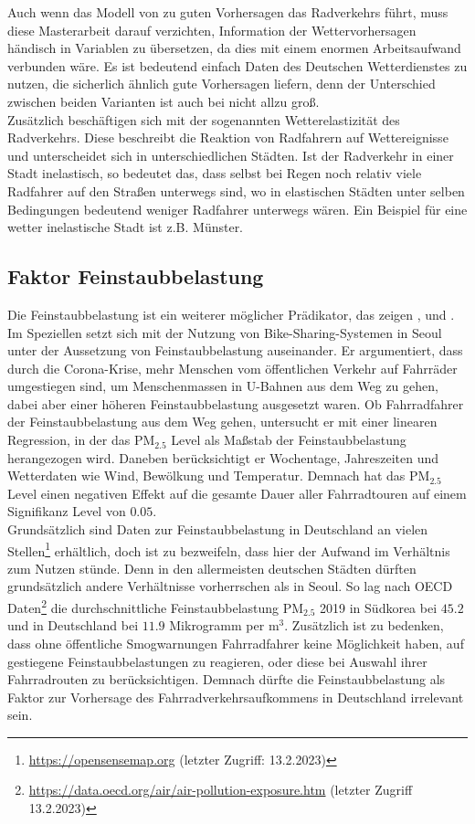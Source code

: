 \documentclass[a4paper,12pt]{thesis}
\begin{document}
Auch wenn das Modell von \cite{Wessel2020} zu guten Vorhersagen das Radverkehrs führt, muss diese Masterarbeit darauf verzichten, Information der Wettervorhersagen händisch in Variablen zu übersetzen, da dies mit einem enormen Arbeitsaufwand verbunden wäre. Es ist bedeutend einfach Daten des Deutschen Wetterdienstes zu nutzen, die sicherlich ähnlich gute Vorhersagen liefern, denn der Unterschied zwischen beiden Varianten ist auch bei \cite{Wessel2020} nicht allzu groß.\\
Zusätzlich beschäftigen sich \cite{Goldmann2021} mit der sogenannten Wetterelastizität des Radverkehrs. Diese beschreibt die Reaktion von Radfahrern auf Wettereignisse und unterscheidet sich in unterschiedlichen Städten. Ist der Radverkehr in einer Stadt inelastisch, so bedeutet das, dass selbst bei Regen noch relativ viele Radfahrer auf den Straßen unterwegs sind, wo in elastischen Städten unter selben Bedingungen bedeutend weniger Radfahrer unterwegs wären. Ein Beispiel für eine wetter inelastische Stadt ist z.B. Münster.


\subsection{Faktor Feinstaubbelastung}

Die Feinstaubbelastung ist ein weiterer möglicher Prädikator, das zeigen \cite{ZHAO2018826}, \cite{Gao2022} und \cite{Hong2022}. Im Speziellen setzt sich \cite{Hong2022} mit der Nutzung von Bike-Sharing-Systemen in Seoul unter der Aussetzung von Feinstaubbelastung auseinander. Er argumentiert, dass durch die Corona-Krise, mehr Menschen vom öffentlichen Verkehr auf Fahrräder umgestiegen sind, um Menschenmassen in U-Bahnen aus dem Weg zu gehen, dabei aber einer höheren Feinstaubbelastung ausgesetzt waren. Ob Fahrradfahrer der Feinstaubbelastung aus dem Weg gehen, untersucht er mit einer linearen Regression, in der das PM$_{2.5}$ Level als Maßstab der Feinstaubbelastung herangezogen wird. Daneben berücksichtigt er Wochentage, Jahreszeiten und Wetterdaten wie Wind, Bewölkung und Temperatur. Demnach hat das PM$_{2.5}$ Level einen negativen Effekt auf die gesamte Dauer aller Fahrradtouren auf einem Signifikanz Level von $0.05$.\\
Grundsätzlich sind Daten zur Feinstaubbelastung in Deutschland an vielen Stellen\footnote{\url{https://opensensemap.org} (letzter Zugriff: 13.2.2023)} erhältlich, doch ist zu bezweifeln, dass hier der Aufwand im Verhältnis zum Nutzen stünde. Denn in den allermeisten deutschen Städten dürften grundsätzlich andere Verhältnisse vorherrschen als in Seoul. So lag nach OECD Daten\footnote{\url{https://data.oecd.org/air/air-pollution-exposure.htm} (letzter Zugriff 13.2.2023)} die durchschnittliche Feinstaubbelastung PM$_{2.5}$ 2019 in Südkorea bei $45.2$ und in Deutschland bei $11.9$ Mikrogramm per m$^3$. Zusätzlich ist zu bedenken, dass ohne öffentliche Smogwarnungen Fahrradfahrer keine Möglichkeit haben, auf gestiegene Feinstaubbelastungen zu reagieren, oder diese bei Auswahl ihrer Fahrradrouten zu berücksichtigen. Demnach dürfte die Feinstaubbelastung als Faktor zur Vorhersage des Fahrradverkehrsaufkommens in Deutschland irrelevant sein.
\end{document}
